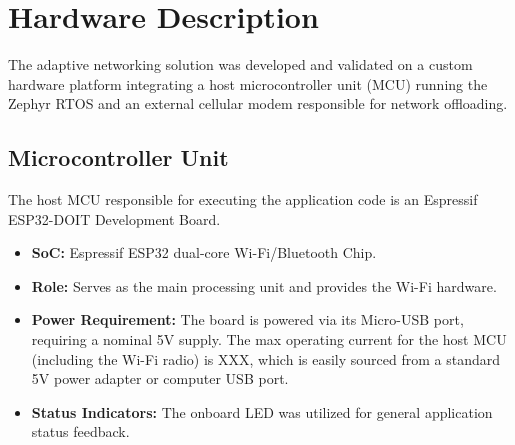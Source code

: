 

\section{Hardware Description}
\label{sec:hardware}

The adaptive networking solution was developed and validated on a custom hardware platform integrating a host microcontroller unit (MCU) running the Zephyr RTOS and an external cellular modem responsible for network offloading.

\subsection{Microcontroller Unit}
\label{ssec:mcu}
The host MCU responsible for executing the application code is an Espressif ESP32-DOIT Development Board.

\begin{itemize}
    \item \textbf{SoC:} Espressif ESP32 dual-core Wi-Fi/Bluetooth Chip.
    \item \textbf{Role:} Serves as the main processing unit and provides the Wi-Fi hardware.
    \item \textbf{Power Requirement:} The board is powered via its Micro-USB port, requiring a nominal 5V supply. The max operating current for the host MCU (including the Wi-Fi radio) is XXX, which is easily sourced from a standard 5V power adapter or computer USB port.
    \item \textbf{Status Indicators:} The onboard LED was utilized for general application status feedback.
\end{itemize}


